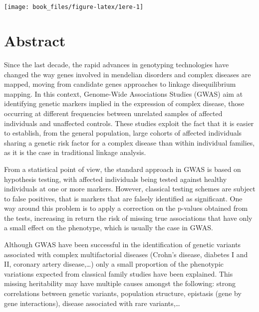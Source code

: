 \documentclass[]{book}
\title{}
\author{}
\date{}
\begin{document}
{
\setcounter{tocdepth}{1}
\tableofcontents
}
\hypertarget{section}{%
\chapter*{}\label{section}}

\begin{center}\texttt{[image: book\_files/figure-latex/1ere-1]} \end{center}

\hypertarget{abstract}{%
\chapter*{Abstract}\label{abstract}}

Since the last decade, the rapid advances in genotyping technologies have changed the way genes involved in mendelian disorders and complex diseases are mapped, moving from candidate genes approaches to linkage disequilibrium mapping. In this context, Genome-Wide Associations Studies (GWAS) aim at identifying genetic markers implied in the expression of complex disease, those occurring at different frequencies between unrelated samples of affected individuals and unaffected controls. These studies exploit the fact that it is easier to establish, from the general population, large cohorts of affected individuals sharing a genetic risk factor for a complex disease than within individual families, as it is the case in traditional linkage analysis.

From a statistical point of view, the standard approach in GWAS is based on hypothesis testing, with affected individuals being tested against healthy individuals at one or more markers. However, classical testing schemes are subject to false positives, that is markers that are falsely identified as significant. One way around this problem is to apply a correction on the p-values obtained from the tests, increasing in return the risk of missing true associations that have only a small effect on the phenotype, which is usually the case in GWAS.

Although GWAS have been successful in the identification of genetic variants associated with complex multifactorial diseases (Crohn's disease, diabetes I and II, coronary artery disease,\ldots{}) only a small proportion of the phenotypic variations expected from classical family studies have been explained. This missing heritability may have multiple causes amongst the following: strong correlations between genetic variants, population structure, epistasis (gene by gene interactions), disease associated with rare variants,\dots
\end{document}

